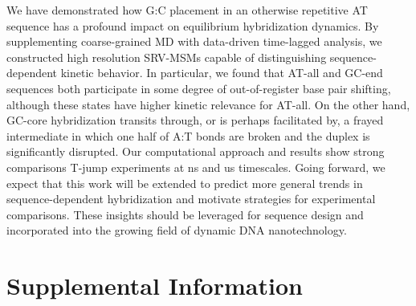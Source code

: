 \documentclass[journal=jpcbfk,manuscript=article]{achemso}
\begin{document}
We have demonstrated how G:C placement in an otherwise repetitive AT sequence has a profound impact on equilibrium hybridization dynamics. By supplementing coarse-grained MD with data-driven time-lagged analysis, we constructed high resolution SRV-MSMs capable of distinguishing sequence-dependent kinetic behavior. In particular, we found that AT-all and GC-end sequences both participate in some degree of out-of-register base pair shifting, although these states have higher kinetic relevance for AT-all. On the other hand, GC-core hybridization transits through, or is perhaps facilitated by, a frayed intermediate in which one half of A:T bonds are broken and the duplex is significantly disrupted. Our computational approach and results show strong comparisons T-jump experiments at ns and us timescales. Going forward, we expect that this work will be extended to predict more general trends in sequence-dependent hybridization and motivate strategies for experimental comparisons. These insights should be leveraged for sequence design and incorporated into the growing field of dynamic DNA nanotechnology. 

\newcommand{\sectionbreak}{\clearpage}
\section{\label{sec:Results}Supplemental Information}

\end{document}
